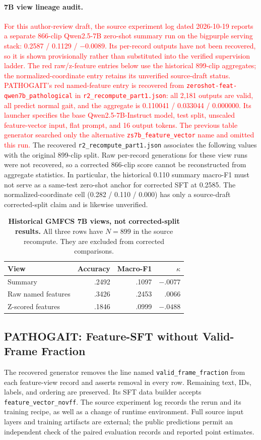 \paragraph{7B view lineage audit.}
\textcolor{red}{For this author-review draft, the source experiment log dated 2026-10-19 reports a separate 866-clip Qwen2.5-7B zero-shot summary run on the bigpurple serving stack: 0.2587 / 0.1129 / $-0.0089$. Its per-record outputs have not been recovered, so it is shown provisionally rather than substituted into the verified supervision ladder. The red raw/z-feature entries below use the historical 899-clip aggregates; the normalized-coordinate entry retains its unverified source-draft status. PATHOGAIT's red named-feature entry is recovered from \texttt{zeroshot-feat-qwen7b\_pathological} in \texttt{r2\_recompute\_part1.json}: all 2,181 outputs are valid, all predict normal gait, and the aggregate is 0.110041 / 0.033044 / 0.000000. Its launcher specifies the base Qwen2.5-7B-Instruct model, test split, unscaled feature-vector input, flat prompt, and 16 output tokens. The previous table generator searched only the alternative \texttt{zs7b\_feature\_vector} name and omitted this run.}
The recovered \texttt{r2\_recompute\_part1.json} associates the following values with the original 899-clip split. Raw per-record generations for these view runs were not recovered, so a corrected 866-clip score cannot be reconstructed from aggregate statistics. In particular, the historical 0.110 summary macro-F1 must not serve as a same-test zero-shot anchor for corrected SFT at 0.2585. The normalized-coordinate cell (0.282 / 0.110 / 0.000) has only a source-draft corrected-split claim and is likewise unverified.
\begin{table}[H]\centering\small
\caption{\textbf{Historical GMFCS 7B views, not corrected-split results.} All three rows have $N=899$ in the source recompute. They are excluded from corrected comparisons.}
\label{tab:gmfcs_view_lineage}
\begin{tabular}{lrrr}\toprule
View & Accuracy & Macro-F1 & $\kappa$\\\midrule
Summary & .2492 & .1097 & $-.0077$\\
Raw named features & .3426 & .2453 & .0066\\
Z-scored features & .1846 & .0999 & $-.0488$\\\bottomrule
\end{tabular}\end{table}

\subsection{PATHOGAIT: Feature-SFT without Valid-Frame Fraction}
The recovered generator removes the line named \texttt{valid\_frame\_fraction} from each feature-view record and asserts removal in every row. Remaining text, IDs, labels, and ordering are preserved. Its SFT data builder accepts \texttt{feature\_vector\_novff}. The source experiment log records the rerun and its training recipe, as well as a change of runtime environment. Full source input layers and training artifacts are external; the public predictions permit an independent check of the paired evaluation records and reported point estimates.

